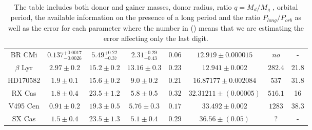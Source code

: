 \begin{table}
\begin{tabular}{c c c c c c c c}
  BR CMi  & $0.137^{+0.0017}_{-0.0026}$&$5.49^{+0.22}_{-0.37}$&$2.31^{+0.29}_{-0.43}$&$0.06$&$12.919\pm 0.000015$&$no$&- \\
   
   $\beta$ Lyr &$2.97\pm 0.2$&$15.2\pm 0.2$&$13.16\pm 0.3$&$0.23$&$12.941\pm 0.002$&$282.4$&21.8\\

HD170582& $1.9\pm 0.1$ & $15.6\pm 0.2$ &$9.0\pm 0.2$& $0.21$&$16.87177\pm 0.002084$&$537$&31.8\\

RX Cas& $1.8\pm 0.4$ & $23.5\pm 1.2$ & $5.8\pm 0.5$ & $0.32$ & $32.31211\pm (0.00005)$ & $516.1$&16\\

V495 Cen& $0.91\pm 0.2$ & $19.3\pm 0.5$ & $5.76 \pm 0.3$ & $0.17$ & $33.492\pm 0.002$ & $1283$&38.3\\

SX Cas& $1.5\pm 0.4$ & $23.5\pm 1.3$ & $5.1\pm 0.4$ & $0.29$ & $36.56\pm (0.05)$ & $?$&-\\
\hline
\end{tabular}
\caption{The table includes both donor and gainer masses, donor radius, ratio $q=M_{d}/M_{g}$
, orbital period, the available information on the presence of a long period and the ratio $P_{long}/P_{orb}$ as well as the error for each parameter where the number in () means that we are estimating the error affecting only the last digit.}
\label{table:sample}
\end{table}


